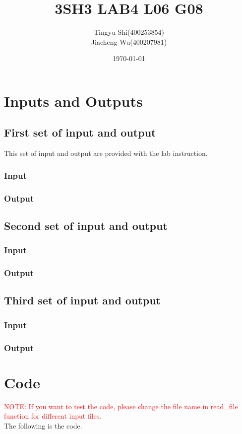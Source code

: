 \documentclass[12pt]{article}
\title{3SH3 LAB4 L06 G08}
\author{Tingyu Shi(400253854)\\Jiacheng Wu(400207981)}
\date{\today}
\begin{document}
\maketitle %
\newpage
\section{Inputs and Outputs}
\subsection{First set of input and output}
This set of input and output are provided with the lab instruction.
\subsubsection{Input}

\subsubsection{Output}
{\footnotesize } 
\newpage
\subsection{Second set of input and output}
\subsubsection{Input}

\subsubsection{Output}
{\footnotesize }
\newpage
\subsection{Third set of input and output}
\subsubsection{Input}

\subsubsection{Output}
{\footnotesize }
\newpage
\section{Code}
\textcolor{red}{NOTE: If you want to test the code, please change the 
file name in read\_file function for different input files.}\\
The following is the code.\\
{\scriptsize }
\end{document}
